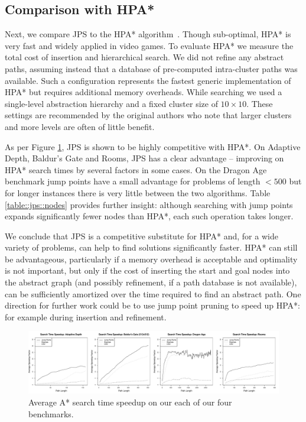 \subsection{Comparison with HPA*}
Next, we compare JPS to the HPA* algorithm~\cite{botea04}.  Though
sub-optimal, HPA* is very fast and widely applied in video games.  To evaluate
HPA* we measure the total cost of insertion and hierarchical search. We did
not refine any abstract paths, assuming instead that a database of
pre-computed intra-cluster paths was available. Such a configuration
represents the fastest generic implementation of HPA* but requires additional
memory overheads.  While searching we used a single-level abstraction
hierarchy and a fixed cluster size of $10\times10$.  These settings are
recommended by the original authors who note that larger clusters and more
levels are often of little benefit.

As per Figure \ref{fig::jps::speedup}, JPS is shown to be highly competitive
with HPA*.  On Adaptive Depth, Baldur's Gate and Rooms, JPS has a clear
advantage -- improving on HPA* search times by several factors in some cases.
On the Dragon Age benchmark jump points have a small advantage for problems of
length $< 500$ but for longer instances there is very little between the two
algorithms.  Table \ref{table::jps::nodes} provides further insight: although
searching with jump points expands significantly fewer nodes than HPA*, each
such operation takes longer.

We conclude that JPS is a competitive substitute for HPA* and, for a wide
variety of problems, can help to find solutions significantly faster.  HPA*
can still be advantageous, particularly if a memory overhead is acceptable and
optimality is not important, but only if the cost of inserting the start and
goal nodes into the abstract graph (and possibly refinement, if a path
database is not available), can be sufficiently amortized over the time
required to find an abstract path.  One direction for further work could be to
use jump point pruning to speed up HPA*: for example during insertion and
refinement.

\begin{figure}[tb]
   \begin{center}
	   \includegraphics[width=0.95\columnwidth, trim = 10mm 10mm 10mm 0mm]
		{chapter_jps/diagrams/speedup.pdf}
   \end{center}
   \caption{Average A* search time speedup on our each of our four benchmarks. }

\label{fig::jps::speedup}
\end{figure}

